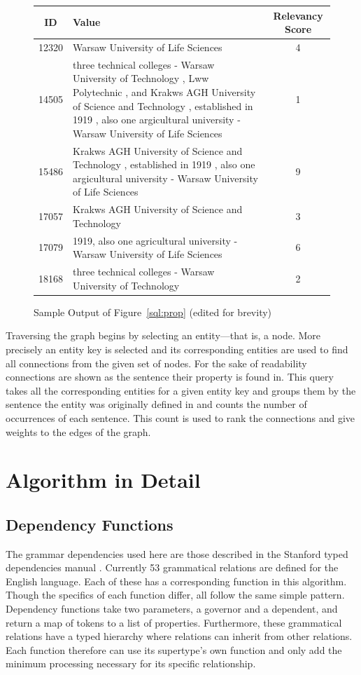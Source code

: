 \begin{figure}
\begin{tabular}{|c|p{8cm}|c|}
\hline
ID & Value & Relevancy Score \\
\hline
12320 &  Warsaw University of Life Sciences & 4 \\
14505 &  three technical colleges - Warsaw University of Technology , Lww Polytechnic , and Krakws AGH University of Science and Technology , established in 1919 , also one argicultural university - Warsaw University of Life Sciences & 1 \\
15486 &  Krakws AGH University of Science and Technology , established in 1919 , also one argicultural university - Warsaw University of Life Sciences & 9 \\
17057 &  Krakws AGH University of Science and Technology & 3 \\
17079 &  1919, also one agricultural university - Warsaw University of Life Sciences & 6 \\
18168 &  three technical colleges - Warsaw University of Technology & 2 \\
\hline
\end{tabular}
\caption{Sample Output of Figure~\ref{sql:prop} (edited for brevity)}
\label{sql:prop-results}
\end{figure}

Traversing the graph begins by selecting an entity---that is, a node.  More precisely an entity key is selected and its corresponding entities are used to find all connections from the given set of nodes.  For the sake of readability connections are shown as the sentence their property is found in.   This query takes all the corresponding entities for a given entity key and groups them by the sentence the entity was originally defined in and counts the number of occurrences of each sentence.  This count is used to rank the connections and give weights to the edges of the graph.

\chapter{Algorithm in Detail}

\section{Dependency Functions}
\label{sec:dep-funcs}

The grammar dependencies used here are those described in the Stanford typed dependencies manual \cite{stanforddep}.  Currently 53 grammatical relations are defined for the English language.  Each of these has a corresponding function in this algorithm.  Though the specifics of each function differ, all follow the same simple pattern.  Dependency functions take two parameters, a governor and a dependent, and return a map of tokens to a list of properties.  Furthermore, these grammatical relations have a typed hierarchy where relations can inherit from other relations.  Each function therefore can use its supertype's own function and only add the minimum processing necessary for its specific relationship.

